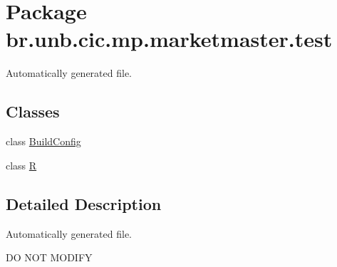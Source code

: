 \hypertarget{namespacebr_1_1unb_1_1cic_1_1mp_1_1marketmaster_1_1test}{}\section{Package br.\+unb.\+cic.\+mp.\+marketmaster.\+test}
\label{namespacebr_1_1unb_1_1cic_1_1mp_1_1marketmaster_1_1test}


Automatically generated file.  


\subsection*{Classes}
\begin{DoxyCompactItemize}
\item 
class \mbox{\hyperlink{classbr_1_1unb_1_1cic_1_1mp_1_1marketmaster_1_1test_1_1BuildConfig}{Build\+Config}}
\item 
class \mbox{\hyperlink{classbr_1_1unb_1_1cic_1_1mp_1_1marketmaster_1_1test_1_1R}{R}}
\end{DoxyCompactItemize}


\subsection{Detailed Description}
Automatically generated file. 

DO N\+OT M\+O\+D\+I\+FY 